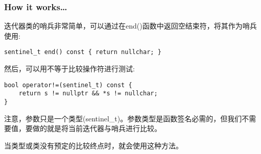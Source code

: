 \subsubsection{How it works…}

迭代器类的哨兵非常简单，可以通过在end()函数中返回空结束符，将其作为哨兵使用:

\begin{lstlisting}[style=styleCXX]
sentinel_t end() const { return nullchar; }
\end{lstlisting}

然后，可以用不等于比较操作符进行测试:

\begin{lstlisting}[style=styleCXX]
bool operator!=(sentinel_t) const {
	return s != nullptr && *s != nullchar;
}
\end{lstlisting}


注意，参数只是一个类型(sentinel\_t)。参数类型是函数签名必需的，但我们不需要值，要做的就是将当前迭代器与哨兵进行比较。

当类型或类没有预定的比较终点时，就会使用这种方法。



















